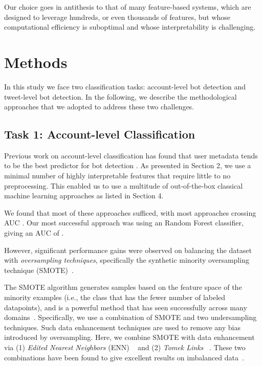 Our choice goes in antithesis to that of many feature-based systems, which are designed to leverage hundreds, or even thousands of features, but whose computational efficiency is suboptimal and whose interpretability is challenging. 

\section{Methods}

In this study we face two classification tasks: account-level bot detection and tweet-level bot detection. In the following, we describe the methodological approaches that we adopted to address these two challenges.

\subsection{Task 1: Account-level Classification}

Previous work on account-level classification has found that user metadata tends to be the best predictor for bot detection \cite{ferrara2017disinformation}. As presented in Section 2, we use a minimal number of highly interpretable features that require little to no preprocessing. This enabled us to use a multitude of out-of-the-box classical machine learning approaches as listed in Section 4. 

We found that most of these approaches sufficed, with most approaches crossing AUC . Our most successful approach was using an Random Forest classifier, giving an AUC of . \par 

However, significant performance gains were observed on balancing the dataset with \textit{oversampling techniques}, specifically the synthetic minority oversampling technique (SMOTE)~\cite{chawla2002smote}. 

The SMOTE algorithm generates samples based on the feature space of the minority examples (i.e., the class that has the fewer number of labeled datapoints), and  is a powerful method that has seen successfully across many domains~\cite{he2009learning}. Specifically, we use a combination of SMOTE and two undersampling techniques. Such data enhancement techniques are used to remove any bias introduced by oversampling. Here, we combine SMOTE with data enhancement via (1) \textit{Edited Nearest Neighbors} (ENN) ~\cite{wilson1972asymptotic} and (2) \textit{Tomek Links} ~\cite{tomek1976two}. These two combinations have been found to give excellent results on imbalanced data~\cite{batista2004study}. 

